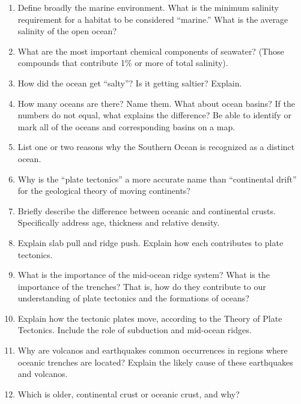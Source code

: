 \documentclass[letterpaper]{tufte-handout}
\begin{document}
\begin{enumerate}
	\item Define broadly the marine environment. What is the minimum salinity requirement for a habitat to be considered ``marine.''  What is the average salinity of the open ocean?

\item What are the most important chemical components of seawater? (Those compounds that contribute 1\% or more of total salinity).

\item How did the ocean get ``salty''? Is it getting saltier?  Explain.

\item How many oceans are there?  Name them. What about ocean basins?  If the numbers do not equal, what explains the difference? Be able to identify or mark all of the oceans and corresponding basins on a map.

\item List one or two reasons why the Southern Ocean is recognized as a distinct ocean.

\item Why is the ``plate tectonics'' a more accurate name than ``continental drift'' for the geological theory of moving continents?

\item Briefly describe the difference between oceanic and continental crusts.  Specifically address age, thickness and relative density.

\item Explain slab pull and ridge push. Explain how each contributes to plate tectonics.

\item What is the importance of the mid-ocean ridge system?  What is the importance of the trenches?  That is, how do they contribute to our understanding of plate tectonics and the formations of oceans?

\item Explain how the tectonic plates move, according to the Theory of Plate Tectonics.  Include the role of subduction and mid-ocean ridges.

\item Why are volcanos and earthquakes common occurrences in regions where oceanic trenches are located?  Explain the likely cause of these earthquakes and volcanos.

\item Which is older, continental crust or oceanic crust, and why?


\end{enumerate}
\end{document}
